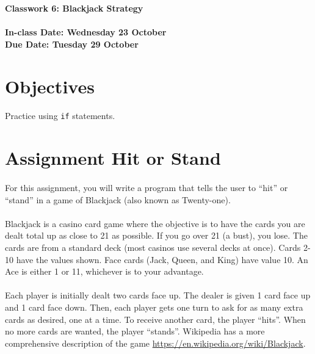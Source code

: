 \documentclass[letter,10pt]{article}
\begin{document}
    
    \huge
    \textbf{Classwork 6: Blackjack Strategy}
    \normalsize
    \\ ~~ \\
    \textbf{In-class Date: Wednesday 23 October} \\
    \textbf{Due Date: Tuesday 29 October}
    
    \section*{Objectives}
    \paragraph{}Practice using \texttt{if} statements.
    
    \section*{Assignment Hit or Stand}
    \paragraph{}For this assignment, you will write a program that tells the user to ``hit'' or ``stand'' in a game of Blackjack (also known as Twenty-one).
    \paragraph{}Blackjack is a casino card game where the objective is to have the cards you are dealt total up as close to 21 as possible. If you go over 21 (a bust), you lose. The cards are from a standard deck (most casinos use several decks at once). Cards 2-10 have the values shown. Face cards (Jack, Queen, and King) have value 10. An Ace is either 1 or 11, whichever is to your advantage.
    \paragraph{}Each player is initially dealt two cards face up. The dealer is given 1 card face up and 1 card face down. Then, each player gets one turn to ask for as many extra cards as desired, one at a time. To receive another card, the player ``hits''. When no more cards are wanted, the player ``stands''. Wikipedia has a more comprehensive description of the game \url{https://en.wikipedia.org/wiki/Blackjack}.
\end{document}
